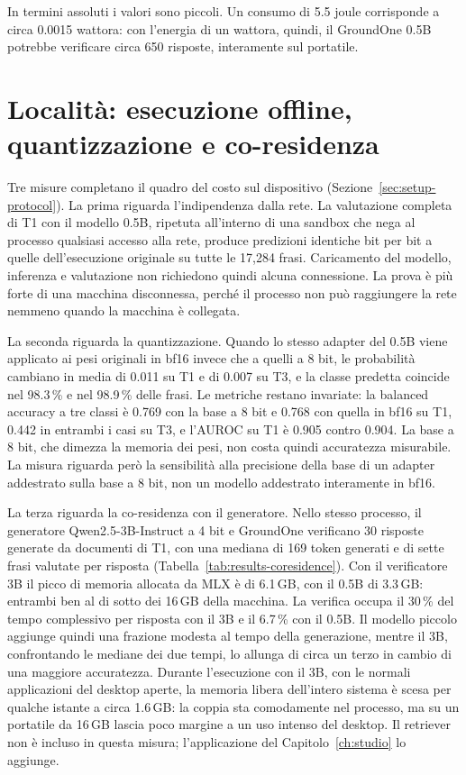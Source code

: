 In termini assoluti i valori sono piccoli. Un consumo di 5.5 joule corrisponde a circa 0.0015 wattora: con l'energia di
un wattora, quindi, il GroundOne 0.5B potrebbe verificare circa 650 risposte, interamente sul portatile.

\section{Località: esecuzione offline, quantizzazione e co-residenza}
\label{sec:results-locality}

Tre misure completano il quadro del costo sul dispositivo (Sezione~\ref{sec:setup-protocol}). La prima riguarda
l'indipendenza dalla rete. La valutazione completa di T1 con il modello 0.5B, ripetuta all'interno di una sandbox che
nega al processo qualsiasi accesso alla rete, produce predizioni identiche bit per bit a quelle dell'esecuzione
originale su tutte le 17{,}284 frasi. Caricamento del modello, inferenza e valutazione non richiedono quindi alcuna
connessione. La prova è più forte di una macchina disconnessa, perché il processo non può raggiungere la rete nemmeno
quando la macchina è collegata.

La seconda riguarda la quantizzazione. Quando lo stesso adapter del 0.5B viene applicato ai pesi originali in bf16
invece che a quelli a 8 bit, le probabilità cambiano in media di 0.011 su T1 e di 0.007 su T3, e la classe predetta
coincide nel 98.3\,\% e nel 98.9\,\% delle frasi. Le metriche restano invariate: la balanced accuracy a tre classi è
0.769 con la base a 8 bit e 0.768 con quella in bf16 su T1, 0.442 in entrambi i casi su T3, e l'AUROC su T1 è 0.905
contro 0.904. La base a 8 bit, che dimezza la memoria dei pesi, non costa quindi accuratezza misurabile. La misura
riguarda però la sensibilità alla precisione della base di un adapter addestrato sulla base a 8 bit, non un modello
addestrato interamente in bf16.

La terza riguarda la co-residenza con il generatore. Nello stesso processo, il generatore Qwen2.5-3B-Instruct a 4 bit e
GroundOne verificano 30 risposte generate da documenti di T1, con una mediana di 169 token generati e di sette frasi
valutate per risposta (Tabella~\ref{tab:results-coresidence}). Con il verificatore 3B il picco di memoria allocata da MLX
è di 6.1\,GB, con il 0.5B di 3.3\,GB: entrambi ben al di sotto dei 16\,GB della macchina. La verifica occupa il
30\,\% del tempo complessivo per risposta con il 3B e il 6.7\,\% con il 0.5B. Il modello piccolo aggiunge quindi
una frazione modesta al tempo della generazione, mentre il 3B, confrontando le mediane dei due tempi, lo allunga di circa un terzo in cambio di una maggiore
accuratezza. Durante l'esecuzione con il 3B, con le normali applicazioni del desktop aperte, la memoria libera
dell'intero sistema è scesa per qualche istante a circa 1.6\,GB: la coppia sta comodamente nel processo, ma su un
portatile da 16\,GB lascia poco margine a un uso intenso del desktop. Il retriever non è incluso in questa misura; l'applicazione del Capitolo~\ref{ch:studio} lo aggiunge.

